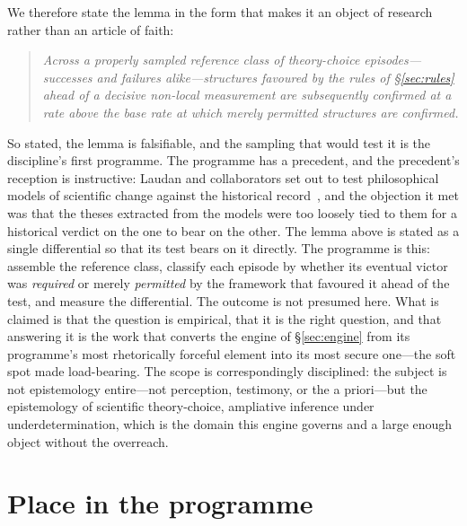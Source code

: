 \documentclass[11pt,a4paper]{article}
\begin{document}
We therefore state the lemma in the form that makes it an object of research rather than an article of faith:
\begin{quote}
\emph{Across a properly sampled reference class of theory-choice episodes---successes and failures alike---structures favoured by the rules of \S\ref{sec:rules} ahead of a decisive non-local measurement are subsequently confirmed at a rate above the base rate at which merely permitted structures are confirmed.}
\end{quote}
So stated, the lemma is falsifiable, and the sampling that would test it is the discipline's first programme. The programme has a precedent, and the precedent's reception is instructive: Laudan and collaborators set out to test philosophical models of scientific change against the historical record~\cite{Laudan1986}, and the objection it met was that the theses extracted from the models were too loosely tied to them for a historical verdict on the one to bear on the other. The lemma above is stated as a single differential so that its test bears on it directly. The programme is this: assemble the reference class, classify each episode by whether its eventual victor was \emph{required} or merely \emph{permitted} by the framework that favoured it ahead of the test, and measure the differential. The outcome is not presumed here. What is claimed is that the question is empirical, that it is the right question, and that answering it is the work that converts the engine of \S\ref{sec:engine} from its programme's most rhetorically forceful element into its most secure one---the soft spot made load-bearing. The scope is correspondingly disciplined: the subject is not epistemology entire---not perception, testimony, or the a priori---but the epistemology of scientific theory-choice, ampliative inference under underdetermination, which is the domain this engine governs and a large enough object without the overreach.

\section{Place in the programme}\label{sec:place}
\end{document}
